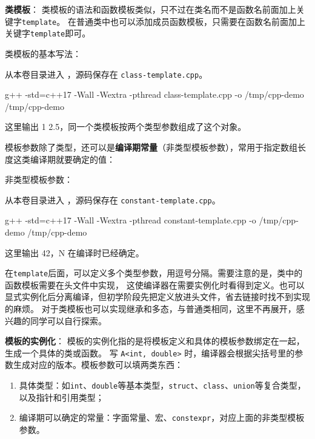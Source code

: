 \textbf{类模板}：
类模板的语法和函数模板类似，只不过在类名而不是函数名前面加上关键字\texttt{template}。
在普通类中也可以添加成员函数模板，只需要在函数名前面加上关键字\texttt{template}即可。

\begin{example}
类模板的基本写法：



从本卷目录进入 ，源码保存在 \texttt{class-template.cpp}。
\begin{tbash}
g++ -std=c++17 -Wall -Wextra -pthread class-template.cpp -o /tmp/cpp-demo
/tmp/cpp-demo
\end{tbash}
这里输出 1 2.5，同一个类模板按两个类型参数组成了这个对象。
\end{example}

模板参数除了类型，还可以是\textbf{编译期常量}（非类型模板参数），常用于指定数组长度这类编译期就要确定的值：

\begin{example}
非类型模板参数：



从本卷目录进入 ，源码保存在 \texttt{constant-template.cpp}。
\begin{tbash}
g++ -std=c++17 -Wall -Wextra -pthread constant-template.cpp -o /tmp/cpp-demo
/tmp/cpp-demo
\end{tbash}
这里输出 42，N 在编译时已经确定。
\end{example}

在\texttt{template}后面，可以定义多个类型参数，用逗号分隔。需要注意的是，类中的函数模板需要在头文件中实现，
这使编译器在需要实例化时看得到定义。也可以显式实例化后分离编译，但初学阶段先把定义放进头文件，省去链接时找不到实现的麻烦。
对于类模板也可以实现继承和多态，与普通类相同，这里不再展开，感兴趣的同学可以自行探索。

\textbf{模板的实例化}：
模板的实例化指的是将模板定义和具体的模板参数绑定在一起，生成一个具体的类或函数。
写 \texttt{A<int, double>} 时，编译器会根据尖括号里的参数生成对应的版本。模板参数可以填两类东西：

\begin{enumerate}
    \item 具体类型：如\texttt{int}、\texttt{double}等基本类型，\texttt{struct}、\texttt{class}、\texttt{union}等复合类型，以及指针和引用类型；
    \item 编译期可以确定的常量：字面常量、宏、\texttt{constexpr}，对应上面的非类型模板参数。
\end{enumerate}

